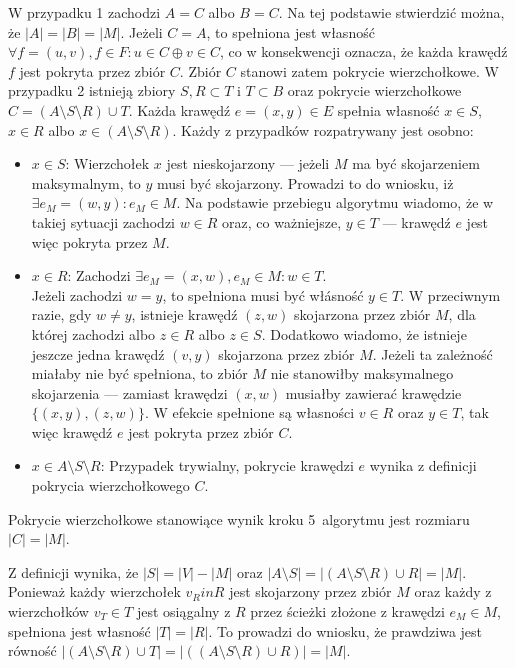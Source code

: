 \begin{bproof}
  W przypadku 1 zachodzi $A = C$ albo $B = C$.
  Na tej podstawie stwierdzić można, że ${|A|=|B|=|M|}$.
  Jeżeli $C = A$, to spełniona jest własność $\forall{f=(u,v), f\in F}: u \in C \oplus v \in C$, co
  w konsekwencji oznacza, że każda krawędź $f$ jest pokryta przez zbiór $C$.
  Zbiór $C$ stanowi zatem pokrycie wierzchołkowe.
  W przypadku 2 istnieją zbiory $S, R \subset T$ i $T \subset B$ oraz pokrycie wierzchołkowe $C=(A \setminus S \setminus R) \cup T$.
  Każda krawędź $e=(x, y) \in E$ spełnia własność $x \in S$, $x \in R$ albo $x \in (A \setminus S \setminus R)$.
  Każdy z przypadków rozpatrywany jest osobno:
  \begin{itemize}
    \item \underline{$x \in S$}: Wierzchołek $x$ jest nieskojarzony --- jeżeli $M$ ma być skojarzeniem maksymalnym, to $y$ musi być skojarzony.
      Prowadzi to do wniosku, iż $\exists{e_M=(w,y)}: e_M \in M$.
      Na podstawie przebiegu algorytmu wiadomo, że w takiej sytuacji zachodzi $w \in R$
      oraz, co ważniejsze, $y \in T$ --- krawędź $e$ jest więc pokryta przez $M$.
    \item \underline{$x \in R$}: Zachodzi $\exists{e_M=(x,w), e_M\in M}: w \in T$. \\
      Jeżeli zachodzi $w=y$, to spełniona musi być włásność $y \in T$.
      W przeciwnym razie, gdy $w \neq y$, istnieje krawędź $(z,w)$ skojarzona przez zbiór $M$, dla której zachodzi albo $z \in R$ albo $z \in S$.
      Dodatkowo wiadomo, że istnieje jeszcze jedna krawędź $(v, y)$ skojarzona przez zbiór $M$.
      Jeżeli ta zależność miałaby nie być spełniona, to zbiór $M$ nie stanowiłby maksymalnego skojarzenia --- zamiast krawędzi $(x,w)$ musiałby zawierać krawędzie $\{(x,y),(z,w)\}$.
      W efekcie spełnione są własności $v \in R$ oraz $y \in T$, tak więc krawędź $e$ jest pokryta przez zbiór $C$.
    \item \underline{$x \in A \setminus S \setminus R$}: Przypadek trywialny,
      pokrycie krawędzi $e$ wynika z definicji pokrycia wierzchołkowego $C$.
  \end{itemize}
\end{bproof}
\begin{theorem}
  Pokrycie wierzchołkowe stanowiące wynik kroku 5\ algorytmu jest rozmiaru $|C| = |M|$. 
\end{theorem}
\begin{bproof}
  Z definicji wynika, że $|S| = |V| - |M|$ oraz $|A \setminus S|=|(A \setminus S
  \setminus R) \cup R|=|M|$.\\
  Ponieważ każdy wierzchołek $v_R in R$ jest skojarzony przez zbiór $M$ oraz każdy z wierzchołków $v_T \in T$ jest osiągalny z $R$ przez ścieżki złożone z krawędzi $e_M \in M$, spełniona jest własność $|T|=|R|$.
  To prowadzi do wniosku, że prawdziwa jest równość $|(A\setminus S\setminus R)\cup T|=|((A \setminus S \setminus R) \cup R)|=|M|$.
\end{bproof}
